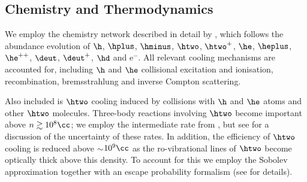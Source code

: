 \subsection{Chemistry and Thermodynamics}
\label{chemistry}
 We employ the chemistry network described in detail by \citet{Greifetal2009b}, which follows the abundance evolution of $\h$, $\hplus$, $\hminus$, $\htwo$, $\htwo^+$, $\he$, $\heplus$, $\he^{++}$, $\deut$, $\deut^+$, $\hd$ and e$^-$. All relevant cooling mechanisms are accounted for, including $\h$ and $\he$ collisional excitation and ionisation, recombination, bremsstrahlung and inverse Compton scattering. 
 
 Also included is $\htwo$ cooling induced by collisions with $\h$ and $\he$ atoms and other $\htwo$ molecules.  Three-body reactions involving $\htwo$ become important above $n \gtrsim 10^8\cc$; we employ the intermediate rate from \citet{PallaSalpeterStahler1983}, but see \citet{Turketal2011} for a discussion of the uncertainty of these rates.
In addition, the efficiency of $\htwo$ cooling is reduced above $\sim$$10^9\cc$ as the ro-vibrational lines of $\htwo$ become optically thick above this density.  To account for this we employ the Sobolev approximation together with an escape probability formalism (see \citealt{Yoshidaetal2006, Greifetal2011} for details). 